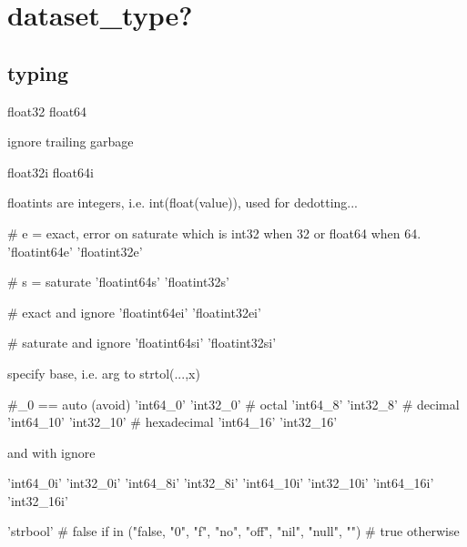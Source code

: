 \section{dataset\_type?}

\subsection{typing}

\begin{python}
float32
float64
\end{python}

ignore trailing garbage

\begin{python}
float32i
float64i
\end{python}

floatints are integers, i.e. int(float(value)), used for dedotting...
\begin{python}
# e = exact, error on saturate which is int32 when 32 or float64 when 64.
'floatint64e'  
'floatint32e'  
\end{python}

\begin{python}
# s = saturate
'floatint64s'  
'floatint32s'  
\end{python}

\begin{python}
# exact and ignore
'floatint64ei' 
'floatint32ei' 
\end{python}

\begin{python}
# saturate and ignore
'floatint64si' 
'floatint32si' 
\end{python}

specify base, i.e. arg to strtol(...,x)
\begin{python}
#_0 == auto (avoid)
    'int64_0'      
    'int32_0'      
# octal
    'int64_8'      
    'int32_8'      
# decimal
    'int64_10'     
    'int32_10'     
# hexadecimal
    'int64_16'     
    'int32_16'     
\end{python}

and with ignore
\begin{python}
    'int64_0i'     
    'int32_0i'     
    'int64_8i'     
    'int32_8i'     
    'int64_10i'    
    'int32_10i'    
    'int64_16i'    
    'int32_16i'    
\end{python}

\begin{python}
'strbool'
# false if in ("false, "0", "f", "no", "off", "nil", "null", "")
# true  otherwise
\end{python}

